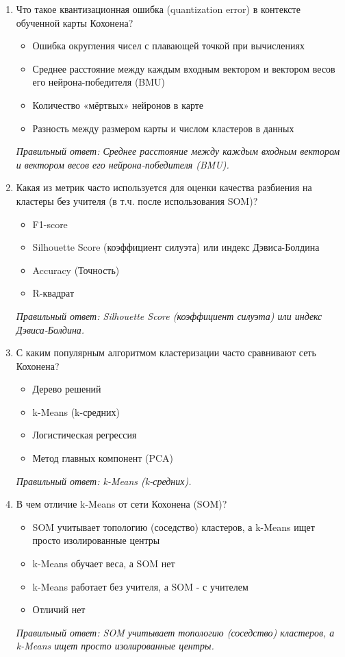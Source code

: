 \begin{enumerate}[label=\textbf{\arabic*.}, leftmargin=0pt, itemsep=1.2em]
\item Что такое квантизационная ошибка (quantization error) в контексте обученной карты Кохонена?
\begin{itemize}[label=$\square$, leftmargin=1.5cm, itemsep=0.2em, topsep=0.3em]
\item Ошибка округления чисел с плавающей точкой при вычислениях
\item Среднее расстояние между каждым входным вектором и вектором весов его нейрона-победителя (BMU)
\item Количество «мёртвых» нейронов в карте
\item Разность между размером карты и числом кластеров в данных
\end{itemize}
{\small\textit{Правильный ответ: Среднее расстояние между каждым входным вектором и вектором весов его нейрона-победителя (BMU).}}

\item Какая из метрик часто используется для оценки качества разбиения на кластеры без учителя (в т.ч. после использования SOM)?
\begin{itemize}[label=$\square$, leftmargin=1.5cm, itemsep=0.2em, topsep=0.3em]
\item F1-score
\item Silhouette Score (коэффициент силуэта) или индекс Дэвиса-Болдина
\item Accuracy (Точность)
\item R-квадрат
\end{itemize}
{\small\textit{Правильный ответ: Silhouette Score (коэффициент силуэта) или индекс Дэвиса-Болдина.}}

\item С каким популярным алгоритмом кластеризации часто сравнивают сеть Кохонена?
\begin{itemize}[label=$\square$, leftmargin=1.5cm, itemsep=0.2em, topsep=0.3em]
\item Дерево решений
\item k-Means (k-средних)
\item Логистическая регрессия
\item Метод главных компонент (PCA)
\end{itemize}
{\small\textit{Правильный ответ: k-Means (k-средних).}}

\item В чем отличие k-Means от сети Кохонена (SOM)?
\begin{itemize}[label=$\square$, leftmargin=1.5cm, itemsep=0.2em, topsep=0.3em]
\item SOM учитывает топологию (соседство) кластеров, а k-Means ищет просто изолированные центры
\item k-Means обучает веса, а SOM нет
\item k-Means работает без учителя, а SOM - с учителем
\item Отличий нет
\end{itemize}
{\small\textit{Правильный ответ: SOM учитывает топологию (соседство) кластеров, а k-Means ищет просто изолированные центры.}}


\end{enumerate}
